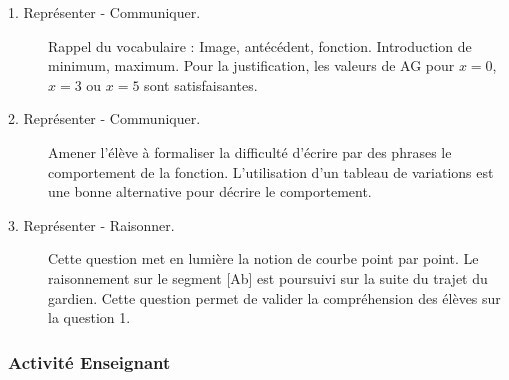 \begin{description}
\item[1. Représenter - Communiquer.] 
Rappel du vocabulaire : Image, antécédent, fonction. Introduction de minimum, maximum.
Pour la justification, les valeurs de AG pour $x=0$, $x=3$ ou $x=5$ sont satisfaisantes.
\item[2. Représenter - Communiquer.] 
Amener l'élève à formaliser la difficulté d'écrire par des phrases le comportement de la fonction. L'utilisation d'un tableau de variations est une bonne alternative pour décrire le comportement.
%
\item[3. Représenter - Raisonner.]
Cette question met en lumière la notion de courbe point par point. Le raisonnement sur le segment [Ab] est poursuivi sur la suite du trajet du gardien. Cette question permet de valider la compréhension des élèves sur la question 1.

\end{description}

\subsubsection{Activité Enseignant}

